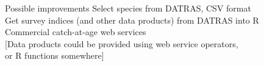 \documentclass[aspectratio=169]{beamer}
\begin{document}

\begin{frame}{Possible improvements}
  Select species from DATRAS, CSV format\\[4ex]
  Get survey indices (and other data products) from DATRAS into R\\[4ex]
  Commercial catch-at-age web services\\[4ex]
  [Data products could be provided using web service operators,\\[1ex]
  or R functions somewhere]
\end{frame}
\end{document}
